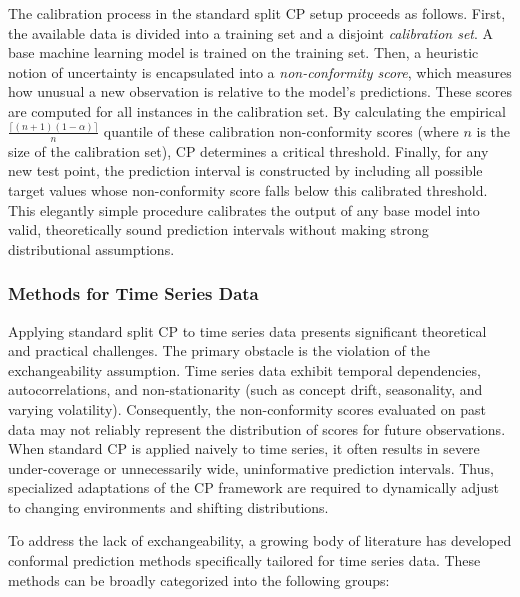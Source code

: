 \documentclass[12pt, a4paper]{article}
\begin{document}
The calibration process in the standard split CP setup proceeds as follows. First, the available data is divided into a training set and a disjoint \textit{calibration set}. A base machine learning model is trained on the training set. Then, a heuristic notion of uncertainty is encapsulated into a \textit{non-conformity score}, which measures how unusual a new observation is relative to the model's predictions. These scores are computed for all instances in the calibration set. By calculating the empirical \(\frac{\lceil (n + 1)(1 - \alpha) \rceil}{n}\) quantile of these calibration non-conformity scores (where \(n\) is the size of the calibration set), CP determines a critical threshold. Finally, for any new test point, the prediction interval is constructed by including all possible target values whose non-conformity score falls below this calibrated threshold. This elegantly simple procedure calibrates the output of any base model into valid, theoretically sound prediction intervals without making strong distributional assumptions.

\subsubsection{Methods for Time Series Data}
Applying standard split CP to time series data presents significant theoretical and practical challenges. The primary obstacle is the violation of the exchangeability assumption. Time series data exhibit temporal dependencies, autocorrelations, and non-stationarity (such as concept drift, seasonality, and varying volatility). Consequently, the non-conformity scores evaluated on past data may not reliably represent the distribution of scores for future observations. When standard CP is applied naively to time series, it often results in severe under-coverage or unnecessarily wide, uninformative prediction intervals. Thus, specialized adaptations of the CP framework are required to dynamically adjust to changing environments and shifting distributions.

To address the lack of exchangeability, a growing body of literature has developed conformal prediction methods specifically tailored for time series data. These methods can be broadly categorized into the following groups:
\end{document}

